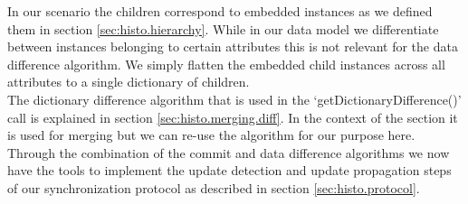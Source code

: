 In our scenario the children correspond to embedded instances as we defined them in section \ref{sec:histo.hierarchy}.
While in our data model we differentiate between instances belonging to certain attributes this is not relevant for the data difference algorithm.
We simply flatten the embedded child instances across all attributes to a single dictionary of children.\\
The dictionary difference algorithm that is used in the `getDictionaryDifference()' call is explained in section \ref{sec:histo.merging.diff}.
In the context of the section it is used for merging but we can re-use the algorithm for our purpose here.\\
Through the combination of the commit and data difference algorithms we now have the tools to implement the update detection and update propagation steps of our synchronization protocol as described in section \ref{sec:histo.protocol}.
